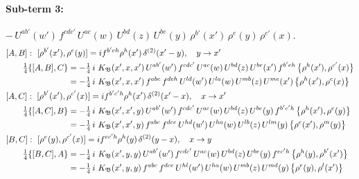 \documentclass[10pt]{article}
\numberwithin{equation}{section}
\begin{document}
\paragraph{Sub-term 3:} $-\,U^{ab'}(w')\,f^{cdc'}\,U^{ac}(w)\,U^{bd}(z)\,U^{be}(y)\,\rho^{b'}(x')\,\rho^{e}(y)\,\rho^{c'}(x)$.
\begin{align}
&[A,B]:\ [\rho^{b'}(x'),\rho^{e}(y)]=i f^{b'eh}\rho^{h}(x')\,\delta^{(2)}(x'-y),\quad y\to x'\notag\\
&\qquad \tfrac14\{[A,B],C\}=-\tfrac14\,i\,\,K_{\mathfrak B}(x',x,x')\,U^{ab'}(w')\,f^{cdc'}\,U^{ac}(w)\,U^{bd}(z)\,U^{be}(x')\,f^{b'eh}\,\big\{\rho^{h}(x'),\rho^{c'}(x)\big\}\notag\\
&\qquad\phantom{\tfrac14\{[A,B],C\}}=-\tfrac14\,i\,\,K_{\mathfrak B}(x',x,x')\,f^{abc}\,f^{deh}\,U^{ld}(w')\,U^{la}(w)\,U^{mb}(z)\,U^{me}(x')\,\big\{\rho^{h}(x'),\rho^{c}(x)\big\}
\label{eq:GI.IV-3-AB}\\
&[A,C]:\ [\rho^{b'}(x'),\rho^{c'}(x)]=i f^{b'c'h}\rho^{h}(x')\,\delta^{(2)}(x'-x),\quad x\to x'\notag\\
&\qquad \tfrac14\{[A,C],B\}=-\tfrac14\,i\,\,K_{\mathfrak B}(x',x',y)\,U^{ab'}(w')\,f^{cdc'}\,U^{ac}(w)\,U^{bd}(z)\,U^{be}(y)\,f^{b'c'h}\,\big\{\rho^{h}(x'),\rho^{e}(y)\big\}\notag\\
&\qquad\phantom{\tfrac14\{[A,C],B\}}=-\tfrac14\,i\,\,K_{\mathfrak B}(x',x',y)\,f^{abc}\,f^{dce}\,U^{hd}(w')\,U^{ha}(w)\,U^{lb}(z)\,U^{lm}(y)\,\big\{\rho^{e}(x'),\rho^{m}(y)\big\}
\label{eq:GI.IV-3-AC}\\
&[B,C]:\ [\rho^{e}(y),\rho^{c'}(x)]=i f^{ec'h}\rho^{h}(y)\,\delta^{(2)}(y-x),\quad x\to y\notag\\
&\qquad \tfrac14\{[B,C],A\}=-\tfrac14\,i\,\,K_{\mathfrak B}(x',y,y)\,U^{ab'}(w')\,f^{cdc'}\,U^{ac}(w)\,U^{bd}(z)\,U^{be}(y)\,f^{ec'h}\,\big\{\rho^{h}(y),\rho^{b'}(x')\big\}\notag\\
&\qquad\phantom{\tfrac14\{[B,C],A\}}=-\tfrac14\,i\,\,K_{\mathfrak B}(x',y,y)\,f^{abc}\,f^{dce}\,U^{hl}(w')\,U^{ha}(w)\,U^{mb}(z)\,U^{md}(y)\,\big\{\rho^{e}(y),\rho^{l}(x')\big\}
\label{eq:GI.IV-3-BC}
\end{align}
\end{document}
